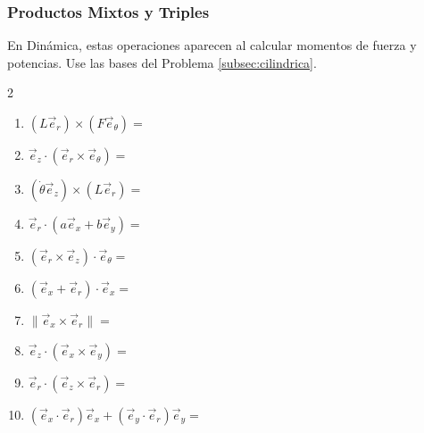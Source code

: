 \subsubsection{Productos Mixtos y Triples}
En Dinámica, estas operaciones aparecen al calcular momentos de fuerza y potencias. Use las bases del Problema \ref{subsec:cilindrica}.

\begin{multicols}{2}
\begin{enumerate}
    \item $(L\vec{e}_r) \times (F\vec{e}_\theta) =$
    \item $\vec{e}_z \cdot (\vec{e}_r \times \vec{e}_\theta) =$
    \item $(\dot{\theta}\vec{e}_z) \times (L\vec{e}_r) =$
    \item $\vec{e}_r \cdot (a\vec{e}_x + b\vec{e}_y) =$
    \item $(\vec{e}_r \times \vec{e}_z) \cdot \vec{e}_\theta =$
    \item $(\vec{e}_x + \vec{e}_r) \cdot \vec{e}_x =$
    \item $\| \vec{e}_x \times \vec{e}_r \| =$
    \item $\vec{e}_z \cdot (\vec{e}_x \times \vec{e}_y) =$
    \item $\vec{e}_r \cdot (\vec{e}_z \times \vec{e}_r) =$
    \item $(\vec{e}_x \cdot \vec{e}_r) \vec{e}_x + (\vec{e}_y \cdot \vec{e}_r) \vec{e}_y =$
\end{enumerate}
\end{multicols}
